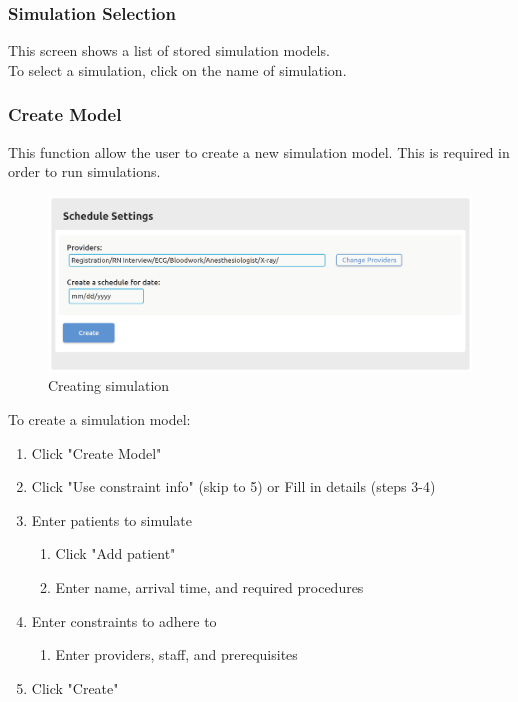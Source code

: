 \documentclass[12pt]{article}
\begin{document}
\subsubsection{Simulation Selection}
This screen shows a list of stored simulation models. \\

To select a simulation, click on the name of simulation.

\subsubsection{Create Model}
This function allow the user to create a new simulation model. This is required in order to run simulations. \\

\begin{figure}[H]
\centering
\includegraphics[width=\textwidth]{simsetting}
\caption{Creating simulation}
\end{figure}

To create a simulation model:
\begin{enumerate}
\item Click "Create Model"
\item Click "Use constraint info" (skip to 5) or Fill in details (steps 3-4)
\item Enter patients to simulate
\begin{enumerate}
\item Click "Add patient"
\item Enter name, arrival time, and required procedures
\end{enumerate}
\item Enter constraints to adhere to
\begin{enumerate}
\item Enter providers, staff, and prerequisites
\end{enumerate}
\item Click "Create"
\end{enumerate}
\end{document}
